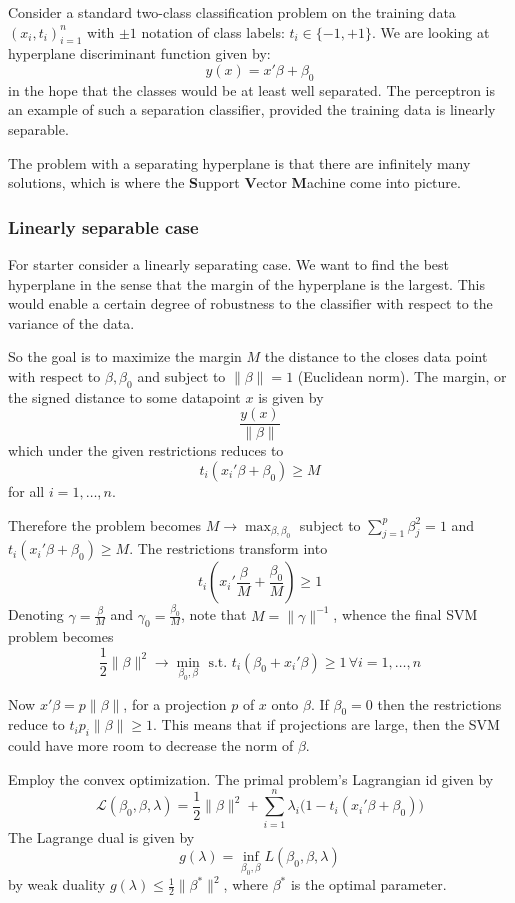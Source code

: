 \documentclass[a4paper]{article}
\newcommand{\Lcal}{\mathcal{L}}
\begin{document}
Consider a standard two-class classification problem on the training data
$(x_i,t_i)_{i=1}^n$ with $\pm1$ notation of class labels: $t_i\in\{-1,+1\}$.
We are looking at hyperplane discriminant function given by:
\[y(x) = x'\beta + \beta_0\]
in the hope that the classes would be at least well separated.
The perceptron is an example of such a separation classifier, provided the 
training data is linearly separable.

The problem with a separating hyperplane is that there are infinitely many
solutions, which is where the \textbf{S}upport \textbf{V}ector \textbf{M}achine
come into picture.

\subsubsection{Linearly separable case} %
\label{ssub:linearly_separable_case}

For starter consider a linearly separating case. We want to find the best hyperplane
in the sense that the margin of the hyperplane is the largest. This would enable a
certain degree of robustness to the classifier with respect to the variance of
the data.

So the goal is to maximize the margin $M$ the distance to the closes data point
with respect to $\beta,\beta_0$ and subject to $\|\beta\|=1$ (Euclidean norm).
The margin, or the signed distance to some datapoint $x$ is given by
\[ \frac{y(x)}{\|\beta\|} \]
which under the given restrictions reduces to
\[ t_i(x_i'\beta + \beta_0) \geq M \]
for all $i=1,\ldots,n$.

Therefore the problem becomes $ M \to \max_{\beta, \beta_0}$ subject to
$\sum_{j=1}^p \beta_j^2 = 1$ and $t_i( x_i'\beta+\beta_0 )\geq M$.
The restrictions transform into
\[ t_i( x_i'\frac{\beta}{M}+\frac{\beta_0}{M} )\geq 1 \]
Denoting $\gamma = \frac{\beta}{M}$ and $\gamma_0 = \frac{\beta_0}{M}$,
note that $M = \|\gamma\|^{-1}$, whence the final SVM problem becomes
\[
\frac{1}{2}\|\beta\|^2 \to \min_{\beta_0,\beta}
\text{ s.t. }
t_i(\beta_0+x_i'\beta)\geq 1\,\forall i=1,\ldots,n
\]

Now $x'\beta = p\|\beta\|$, for a projection $p$ of $x$ onto $\beta$. If $\beta_0=0$
then the restrictions reduce to $t_i p_i\|\beta\|\geq 1$. This means that if projections
are large, then the SVM could have more room to decrease the norm of $\beta$.

Employ the convex optimization. The primal problem's Lagrangian id given by
\[
\Lcal(\beta_0, \beta, \lambda)
= \frac{1}{2} \|\beta\|^2 + \sum_{i=1}^n \lambda_i \bigl(1 - t_i(x_i'\beta+\beta_0) \bigr)
\]
The Lagrange dual is given by
\[
g(\lambda) = \inf_{\beta_0,\beta} L(\beta_0, \beta, \lambda)
\]
by weak duality $g(\lambda)\leq \frac{1}{2}\|\beta^*\|^2$, where $\beta^*$ is the
optimal parameter.
\end{document}
